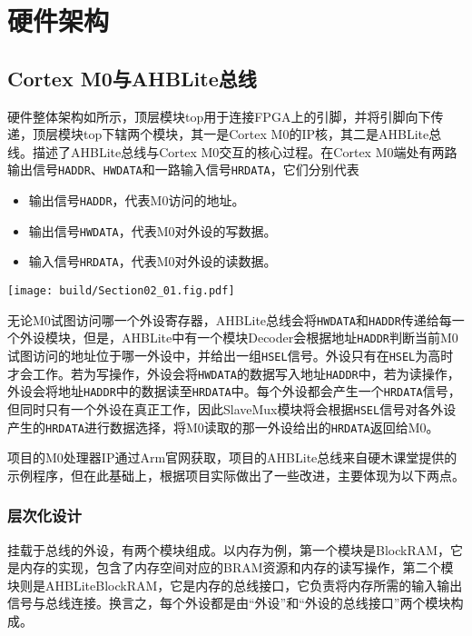 \section{硬件架构}

\subsection{Cortex M0与AHBLite总线}

硬件整体架构如所示，顶层模块top用于连接FPGA上的引脚，并将引脚向下传递，顶层模块top下辖两个模块，其一是Cortex M0的IP核，其二是AHBLite总线。描述了AHBLite总线与Cortex M0交互的核心过程。在Cortex M0端处有两路输出信号\texttt{HADDR}、\texttt{HWDATA}和一路输入信号\texttt{HRDATA}，它们分别代表
\begin{itemize}
    \item 输出信号\texttt{HADDR}，代表M0访问的地址。
    \item 输出信号\texttt{HWDATA}，代表M0对外设的写数据。
    \item 输入信号\texttt{HRDATA}，代表M0对外设的读数据。
\end{itemize}
\begin{Figure}[硬件架构]
    \texttt{[image: build/Section02\_01.fig.pdf]}
\end{Figure}

无论M0试图访问哪一个外设寄存器，AHBLite总线会将\texttt{HWDATA}和\texttt{HADDR}传递给每一个外设模块，但是，AHBLite中有一个模块Decoder会根据地址\texttt{HADDR}判断当前M0试图访问的地址位于哪一外设中，并给出一组\texttt{HSEL}信号。外设只有在\texttt{HSEL}为高时才会工作。若为写操作，外设会将\texttt{HWDATA}的数据写入地址\texttt{HADDR}中，若为读操作，外设会将地址\texttt{HADDR}中的数据读至\texttt{HRDATA}中。每个外设都会产生一个\texttt{HRDATA}信号，但同时只有一个外设在真正工作，因此SlaveMux模块将会根据\texttt{HSEL}信号对各外设产生的\texttt{HRDATA}进行数据选择，将M0读取的那一外设给出的\texttt{HRDATA}返回给M0。

项目的M0处理器IP通过Arm官网获取，项目的AHBLite总线来自硬木课堂提供的示例程序，但在此基础上，根据项目实际做出了一些改进，主要体现为以下两点。

\subsubsection{层次化设计}
挂载于总线的外设，有两个模块组成。以内存为例，第一个模块是BlockRAM，它是内存的实现，包含了内存空间对应的BRAM资源和内存的读写操作，第二个模块则是AHBLiteBlockRAM，它是内存的总线接口，它负责将内存所需的输入输出信号与总线连接。换言之，每个外设都是由“外设”和“外设的总线接口”两个模块构成。

